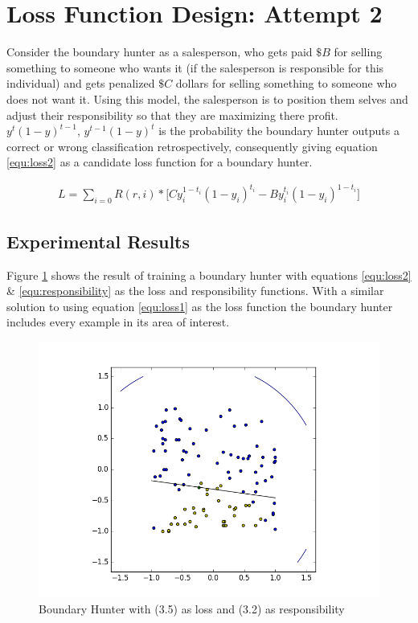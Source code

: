 \documentclass[notitlepage]{report}
\theoremstyle{definition}
\begin{document}
\section{Loss Function Design: Attempt 2}
Consider the boundary hunter as a salesperson, who gets paid $\$B$ for selling something to someone who wants it (if the salesperson is responsible for this individual) and gets penalized $\$C$ dollars for selling something to someone who does not want it. Using this model, the salesperson is to position them selves and adjust their responsibility so that they are maximizing there profit.\\

$y^t(1-y)^{t-1}$, $y^{t-1}(1-y)^t$ is the probability the boundary hunter outputs a correct or wrong classification retrospectively, consequently giving equation \ref{equ:loss2} as a candidate loss function for a boundary hunter.

\begin{align}
L = \sum_{i=0} R(r, i) * \big[Cy_i^{1-t_i}(1-y_i)^{t_i} - By_i^{t_i}(1-y_i)^{1-t_i} \big]
\label{equ:loss2}
\end{align}

\subsection{Experimental Results}
Figure \ref{fig:boundaryhunter-l2-01} shows the result of training a boundary hunter with equations \ref{equ:loss2} \& \ref{equ:responsibility} as the loss and responsibility functions. With a similar solution to using equation \ref{equ:loss1} as the loss function the boundary hunter includes every example in its area of interest.\\

\begin{figure}[H]
\centering
  \begin{minipage}[b]{0.4\textwidth}
    \includegraphics[width=\textwidth]{BoundaryHunter-Attempt3-01.png}
    \caption{Boundary Hunter with (3.5) as loss and (3.2) as responsibility}
    \label{fig:boundaryhunter-l2-01}
  \end{minipage}
  \hfill
\end{figure}
\end{document}
